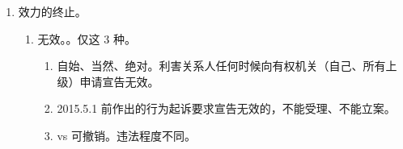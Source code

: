 \begin{enumerate}
\begin{enumerate}
        \end{enumerate}
        \begin{kk}{xx 是否合法。主观题必占 1 问}
          各自违法情况互相独立，可同时存在。。
          \begin{enumerate}
            \item {}。。
                  。
            \item {}。
                  \begin{enumerate}
                    \item {}。
                    \item {}。
                  \end{enumerate}
            \item {}。。。
                  \begin{enumerate}
                    \item {}法定程序。。
                    \item {}法定程序。。
                  \end{enumerate}
            \item 法律依据。。
            \item 内容明显不合理（拟制为违法）。。
          \end{enumerate}
          \tcblower
          客观题注意题目问的是哪个，避免张冠李戴。
        \end{kk}
  \item 效力的终止。
        \begin{enumerate}
          \item 无效。。仅这 3 种。
                \begin{enumerate}
                  \item 自始、当然、绝对。利害关系人任何时候向有权机关（自己、所有上级）申请宣告无效。
                  \item 2015.5.1 前作出的行为起诉要求宣告无效的，不能受理、不能立案。
                  \item vs 可撤销。违法程度不同。

\end{enumerate}
\end{enumerate}
\end{enumerate}
